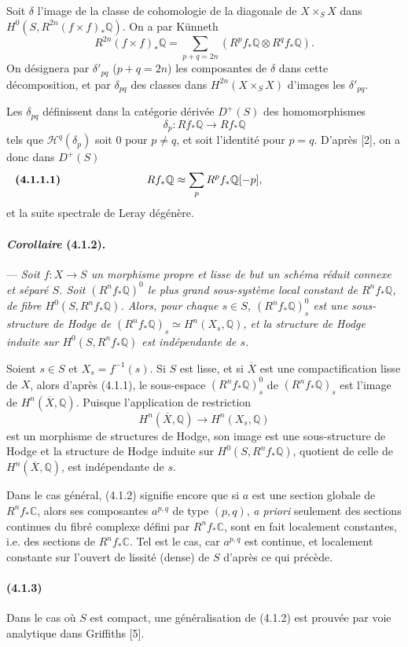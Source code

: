 \documentclass[10pt]{article}
\newcommand{\C}{\mathbb C}
\newcommand{\Q}{\mathbb Q}
\begin{document}
Soit $\delta$ l'image de la classe de cohomologie de la diagonale de $X\times_SX$ dans $H^0(S,R^{2n}(f\times f)_*\Q)$. On a par Künneth
\[
R^{2n}(f\times f)_*\Q=
\sum_{p+q=2n}(R^pf_*\Q\otimes R^qf_*\Q).
\]
On désignera par $\delta'_{pq}$ ($p+q=2n$) les composantes de $\delta$ dans cette décomposition, et par $\delta_{pq}$ des classes dans $H^{2n}(X\times_SX)$ d'images les $\delta'_{pq}$.

Les $\delta_{pq}$ définissent dans la catégorie dérivée $D^+(S)$ des homomorphismes
\[
\delta_p:Rf_*\Q\longrightarrow Rf_*\Q
\]
tels que $\mathcal H^q(\delta_p)$ soit $0$ pour $p\ne q$, et soit l'identité pour $p=q$. D'après [2], on a donc dans $D^+(S)$
\[
\makebox[\textwidth][s]{\textbf{(4.1.1.1)}\hfill$\displaystyle Rf_*\Q\approx\sum_p R^pf_*\Q[-p],$\hfill\phantom{\textbf{(4.1.1.1)}}}
\]
et la suite spectrale de Leray dégénère.

\paragraph{\emph{Corollaire} (4.1.2).} --- {\itshape Soit $f:X\to S$ un morphisme propre et lisse de but un schéma réduit connexe et séparé $S$. Soit $(R^nf_*\Q)^0$ le plus grand sous-système local constant de $R^nf_*\Q$, de fibre $H^0(S,R^nf_*\Q)$. Alors, pour chaque $s\in S$, $(R^nf_*\Q)^0_s$ est une sous-structure de Hodge de $(R^nf_*\Q)_s\simeq H^n(X_s,\Q)$, et la structure de Hodge induite sur $H^0(S,R^nf_*\Q)$ est indépendante de $s$.}

Soient $s\in S$ et $X_s=f^{-1}(s)$. Si $S$ est lisse, et si $\overline X$ est une compactification lisse de $X$, alors d'après (4.1.1), le sous-espace $(R^nf_*\Q)^0_s$ de $(R^nf_*\Q)_s$ est l'image de $H^n(\overline X,\Q)$. Puisque l'application de restriction
\[
H^n(\overline X,\Q)\longrightarrow H^n(X_s,\Q)
\]
est un morphisme de structures de Hodge, son image est une sous-structure de Hodge et la structure de Hodge induite sur $H^0(S,R^nf_*\Q)$, quotient de celle de $H^n(\overline X,\Q)$, est indépendante de $s$.

Dans le cas général, (4.1.2) signifie encore que si $a$ est une section globale de $R^nf_*\C$, alors ses composantes $a^{p,q}$ de type $(p,q)$, \emph{a priori} seulement des sections continues du fibré complexe défini par $R^nf_*\C$, sont en fait localement constantes, i.e. des sections de $R^nf_*\C$. Tel est le cas, car $a^{p,q}$ est continue, et localement constante sur l'ouvert de lissité (dense) de $S$ d'après ce qui précède.

\paragraph{(4.1.3)} Dans le cas où $S$ est compact, une généralisation de (4.1.2) est prouvée par voie analytique dans Griffiths [5].
\end{document}
